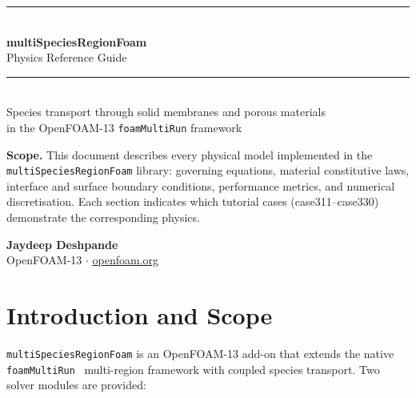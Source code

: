 \documentclass[11pt,a4paper]{article}
\begin{document}

\begin{titlepage}
  \centering
  \vspace*{20mm}
  {\color{foamblue}\rule{\linewidth}{2pt}}\\[6mm]
  {\Huge\bfseries\color{foamblue} multiSpeciesRegionFoam}\\[3mm]
  {\Large Physics Reference Guide}\\[4mm]
  {\color{foamblue}\rule{\linewidth}{1pt}}\\[10mm]
  {\large Species transport through solid membranes and porous materials\\
   in the OpenFOAM-13 \texttt{foamMultiRun} framework}\\[15mm]

  \begin{tcolorbox}[casebox,width=0.85\linewidth]
    \textbf{Scope.}
    This document describes every physical model implemented in the
    \texttt{multiSpeciesRegionFoam} library: governing equations, material
    constitutive laws, interface and surface boundary conditions, performance
    metrics, and numerical discretisation. Each section indicates which tutorial
    cases (case311–case330) demonstrate the corresponding physics.
  \end{tcolorbox}

  \vspace{30pt}


  {\large\bfseries Jaydeep Deshpande}\\[6mm]
  \vfill
  {\small OpenFOAM-13 $\cdot$ \href{https://openfoam.org}{openfoam.org}}
\end{titlepage}

\tableofcontents
\newpage

\section{Introduction and Scope}
\label{sec:intro}

\texttt{multiSpeciesRegionFoam} is an OpenFOAM-13 add-on that extends the
native \texttt{foamMultiRun}~\cite{CFDDirect} multi-region framework with coupled species
transport.  Two solver modules are provided:
\end{document}
